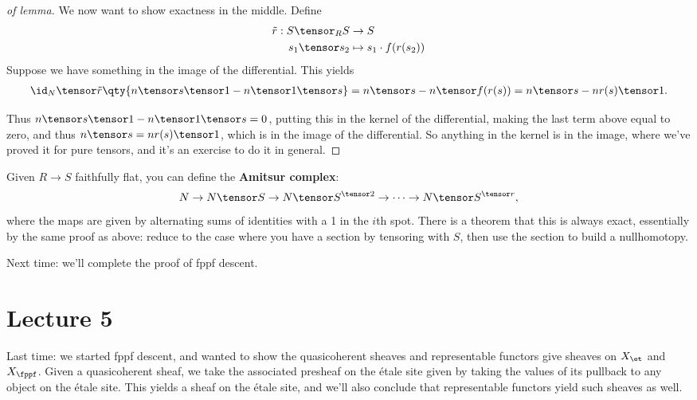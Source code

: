 \begin{proof}[of lemma]
We now want to show exactness in the middle. Define
\begin{align*}
\tilde r: S\tensor_R S &\to S \\
s_1 \tensor s_2 &\mapsto s_1 \cdot f(r(s_2))
\end{align*} Suppose we have something in the image of the differential.
This yields
\begin{align*}  
\id_N \tensor \tilde r \qty{n\tensor s\tensor 1 - n\tensor 1 \tensor s}
= n\tensor s - n\tensor f(r(s))
= n\tensor s - nr(s) \tensor 1
.\end{align*}

Thus \(n\tensor s\tensor 1 - n\tensor 1\tensor s = 0\), putting this in
the kernel of the differential, making the last term above equal to
zero, and thus \(n\tensor s = n r(s) \tensor 1\), which is in the image
of the differential. So anything in the kernel is in the image, where
we've proved it for pure tensors, and it's an exercise to do it in
general.

\end{proof}

\begin{remark}

Given \(R\to S\) faithfully flat, you can define the \textbf{Amitsur
complex}:
\begin{align*}  
N \to N\tensor S \to N\tensor S^{\tensor 2} \to \cdots \to N\tensor S^{\tensor r}
,\end{align*} where the maps are given by alternating sums of identities
with a 1 in the \(i\)th spot. There is a theorem that this is always
exact, essentially by the same proof as above: reduce to the case where
you have a section by tensoring with \(S\), then use the section to
build a nullhomotopy.

\end{remark}

Next time: we'll complete the proof of fppf descent.

\hypertarget{lecture-5}{%
\section{Lecture 5}\label{lecture-5}}

Last time: we started fppf descent, and wanted to show the quasicoherent
sheaves and representable functors give sheaves on \(X_{\et}\) and
\(X_{\fppf}\). Given a quasicoherent sheaf, we take the associated
presheaf on the étale site given by taking the values of its pullback to
any object on the étale site. This yields a sheaf on the étale site, and
we'll also conclude that representable functors yield such sheaves as
well.

